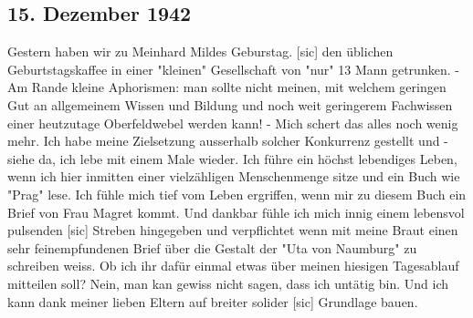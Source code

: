 \subsection{15. Dezember 1942}

Gestern haben wir zu Meinhard Mildes Geburstag.{\color{red} [sic] } den \"{u}blichen Geburtstagskaffee in einer "kleinen" Gesellschaft von "nur" 13 Mann getrunken.
- Am Rande kleine Aphorismen: man sollte nicht meinen, mit welchem geringen Gut an allgemeinem Wissen und Bildung und noch weit geringerem Fachwissen einer heutzutage Oberfeldwebel werden kann!
- Mich schert das alles noch wenig mehr.
Ich habe meine Zielsetzung ausserhalb solcher Konkurrenz gestellt und - siehe da, ich lebe mit einem Male wieder.
Ich f\"{u}hre ein h\"{o}chst lebendiges Leben, wenn ich hier inmitten einer vielz\"{a}hligen Menschenmenge sitze und ein Buch wie "Prag" lese.
Ich f\"{u}hle mich tief vom Leben ergriffen, wenn mir zu diesem Buch ein Brief von Frau Magret kommt.
Und dankbar f\"{u}hle ich mich innig einem lebensvol pulsenden{\color{red} [sic] } Streben hingegeben und verpflichtet wenn mit meine Braut einen sehr feinempfundenen Brief \"{u}ber die Gestalt der "Uta von Naumburg" zu schreiben weiss.
Ob ich ihr daf\"{u}r einmal etwas \"{u}ber meinen hiesigen Tagesablauf mitteilen soll?
Nein, man kan gewiss nicht sagen, dass ich unt\"{a}tig bin.
Und ich kann dank meiner lieben Eltern auf breiter solider{\color{red} [sic] } Grundlage bauen.

\clearpage
